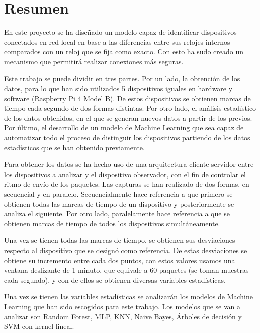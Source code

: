 
\chapter*{Resumen}
 \label{chap:resumen}

En este proyecto se ha diseñado un modelo capaz de identificar dispositivos conectados en red local en base a las diferencias entre sus relojes internos comparados con un reloj que se fija como exacto. Con esto ha sudo creado un mecanismo que permitirá realizar conexiones más seguras.

Este trabajo se puede dividir en tres partes. Por un lado, la obtención de los datos, para lo que han sido utilizados 5 dispositivos iguales en hardware y software (Raspberry Pi 4 Model B). De estos dispositivos se obtienen marcas de tiempo cada segundo de dos formas distintas. Por otro lado, el análisis estadístico de los datos obtenidos, en el que se generan nuevos datos a partir de los previos. Por último, el desarrollo de un modelo de Machine Learning que sea capaz de automatizar todo el proceso de distinguir los dispositivos partiendo de los datos estadísticos que se han obtenido previamente.

Para obtener los datos se ha hecho uso de una arquitectura cliente-servidor entre los dispositivos a analizar y el dispositivo observador, con el fin de controlar el ritmo de envío de los paquetes. Las capturas se han realizado de dos formas, en secuencial y en paralelo. Secuencialmente hace referencia a que primero se obtienen todas las marcas de tiempo de un dispositivo y posteriormente se analiza el siguiente. Por otro lado, paralelamente hace referencia a que se obtienen marcas de tiempo de todos los dispositivos simultáneamente.

Una vez se tienen todas las marcas de tiempo, se obtienen sus desviaciones respecto al dispositivo que se designó como referencia. De estas desviaciones se obtiene su incremento entre cada dos puntos, con estos valores usamos una ventana deslizante de 1 minuto, que equivale a 60 paquetes (se toman muestras cada segundo), y con de ellos se obtienen diversas variables estadísticas.

Una vez se tienen las variables estadísticas se analizarán los modelos de Machine Learning que han sido escogidos para este trabajo. Los modelos que se van a analizar son Random Forest, MLP, KNN, Naive Bayes, Árboles de decisión y SVM con kernel lineal. 

